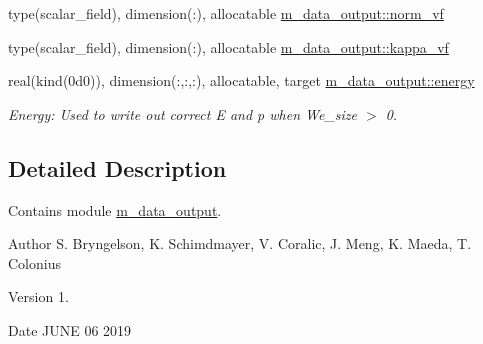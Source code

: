 \begin{DoxyCompactItemize}
\item 
type(scalar\+\_\+field), dimension(\+:), allocatable \hyperlink{namespacem__data__output_ae17a432fc2e0bc9f3a0c0614ea1cd6f8}{m\+\_\+data\+\_\+output\+::norm\+\_\+vf}
\item 
type(scalar\+\_\+field), dimension(\+:), allocatable \hyperlink{namespacem__data__output_a1b71fe1b222b55aa5315838816902b33}{m\+\_\+data\+\_\+output\+::kappa\+\_\+vf}
\item 
real(kind(0d0)), dimension(\+:,\+:,\+:), allocatable, target \hyperlink{namespacem__data__output_a8ef7ff0b857e6a25f92ddfba6ffdc731}{m\+\_\+data\+\_\+output\+::energy}
\begin{DoxyCompactList}\small\item\em Energy\+: Used to write out correct E and p when We\+\_\+size $>$ 0. \end{DoxyCompactList}\end{DoxyCompactItemize}



\subsection{Detailed Description}
Contains module \hyperlink{namespacem__data__output}{m\+\_\+data\+\_\+output}. 

\begin{DoxyAuthor}{Author}
S. Bryngelson, K. Schimdmayer, V. Coralic, J. Meng, K. Maeda, T. Colonius 
\end{DoxyAuthor}
\begin{DoxyVersion}{Version}
1. 
\end{DoxyVersion}
\begin{DoxyDate}{Date}
J\+U\+NE 06 2019 
\end{DoxyDate}
